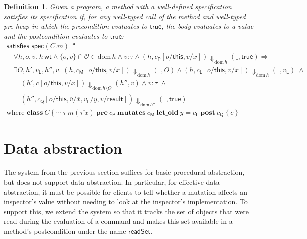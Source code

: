 \documentclass{article}
\newtheorem{definition}{Definition}
\begin{document}
\begin{definition}
Given a program, a method with a well-defined specification \emph{satisfies its specification} if, for any well-typed call of the method and well-typed pre-heap in which the precondition evaluates to $\mathsf{true}$, the body evaluates to a value and the postcondition evaluates to $\mathsf{true}$:
$$\begin{array}{l}
\mathsf{satisfies\_spec}(C.m) \triangleq\\
\quad \forall h, o, \overline{v}.\;h\,\mathsf{wt} \land \{o, \overline{v}\} \cap \mathcal{O} \in \mathrm{dom}\,h \land \overline{v} : \overline{\tau} \land (h, c_\mathsf{P}[o/\mathsf{this},\overline{v}/\overline{x}]) \Downarrow_{\mathrm{dom}\,h} (\_, \mathsf{true}) \Rightarrow\\
\quad \exists O, h', v_\mathsf{L}, h'', v.\;(h, c_\mathsf{M}[o/\mathsf{this},\overline{v}/\overline{x}]) \Downarrow_{\mathrm{dom}\,h} (\_, O) \land (h, c_\mathsf{L}[o/\mathsf{this},\overline{v}/\overline{x}]) \Downarrow_{\mathrm{dom}\,h} (\_, v_\mathsf{L})\;\land\\
\quad\quad (h', c[o/\mathsf{this},\overline{v}/\overline{x}]) \Downarrow_{\mathrm{dom}\,h\setminus O} (h'', v) \land v : \tau\;\land\\
\quad\quad (h'', c_\mathsf{Q}[o/\mathsf{this},\overline{v}/\overline{x}, v_\mathsf{L}/y, v/\mathsf{result}]) \Downarrow_{\mathsf{dom}\,h''} (\_, \mathsf{true})\\
\textrm{where $\mathbf{class}\ C\ \{\ \cdots\ \tau\ m(\overline{\tau\ x})\ \mathbf{pre}\ c_\mathsf{P}\ \mathbf{mutates}\ c_\mathsf{M}\ \mathbf{let\_old}\ y = c_\mathsf{L}\ \mathbf{post}\ c_\mathsf{Q}\ \{\ c\ \}$}
\end{array}$$
\end{definition}

\section{Data abstraction}

The system from the previous section suffices for basic procedural abstraction, but does not support data abstraction. In particular, for effective data abstraction, it must be possible for clients to tell whether a mutation affects an inspector's value without needing to look at the inspector's implementation. To support this, we extend the system so that it tracks the set of objects that were read during the evaluation of a command and makes this set available in a method's postcondition under the name $\mathsf{readSet}$. 
\end{document}
